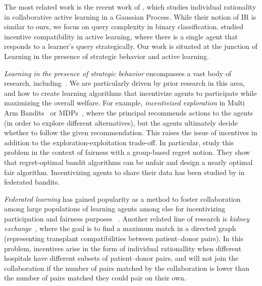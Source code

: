 The most related work is the recent work of \cite{xu2023fair}, which studies individual rationality in collaborative active learning in a Gaussian Process. While their notion of IR is similar to ours, we focus on query complexity in binary classification. \cite{echenique2019incentive} studied incentive compatibility in active learning, where there is a single agent that responds to a learner's query strategically.
Our work is situated at the junction of Learning in the presence of strategic behavior and active learning. 

\textit{Learning in the presence of strategic behavior}  encompasses a vast body of research, including~\citep{ben-porat23, Zhang22,hardt2016strategic}. 
We are particularly driven by prior research %
in this area, and how to create learning algorithms that incentivize agents to participate while maximizing the overall welfare.  For example, \textit{incentivized exploration} in Multi Arm Bandits~\citep{Kremer-JPE14,MansourSS15,MansourSSW16,MansourSW18, Cohen19,Che-13,BaharST16,Bahar2019FiduciaryB,Bahar19,Immorlica19,Immorlica20,Sellke21,banihashem2023bandit,Slivkins17,slivkins2019introduction} or MDPs~\citep{simchowitz2023exploration}, where the principal recommends actions to the agents (in order to explore different alternatives), but the agents ultimately decide whether to follow the given recommendation. This raises the issue of incentives in addition to the exploration-exploitation trade-off. In particular,\citep{Baek21} study this problem in the context of fairness with a group-based regret notion. They show that regret-optimal bandit algorithms can be unfair and design a nearly optimal fair algorithm. Incentivizing agents to share their data has been studied by \cite{wei2023incentivized} in federated bandits.

\textit{Federated learning}  has gained popularity as a method to foster collaboration among large populations of learning agents among else for incentivizing participation and fairness purposes ~\citep{BlumHPS21,Lyu2020,Donahue_Kleinberg_2021,Donahue22Fair,DonahueK21,Donahue23}. 
Another related line of research is \textit{kidney exchange}~\citep{Roth04,AshlagiR11,BlumIHPPV17kidney,BlumG21,BlumMansour20,DickersonPS19}, where the goal is to find a maximum match in a directed graph (representing transplant compatibilities between patient–donor pairs). In this problem, incentives arise in the form of individual rationallity when different hospitals have different subsets of patient–donor pairs, and will not join the collaboration if the number of pairs matched by the collaboration is lower than the number of pairs matched they could pair on their own.


